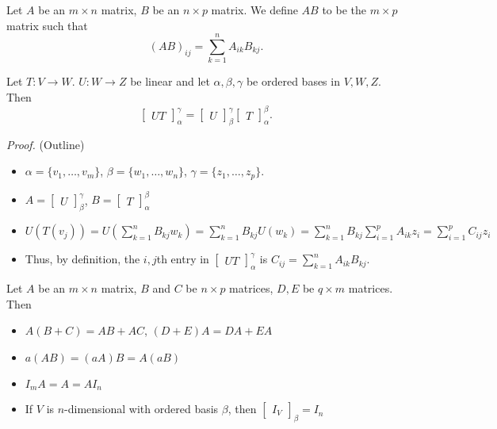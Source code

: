 \documentclass[12pt]{article}
\newenvironment{theorem}[2][Theorem]{\begin{trivlist}
\item[\hskip \labelsep {\bfseries #1}\hskip \labelsep {\bfseries #2.}]}{\end{trivlist}}
\newenvironment{definition}[2][Definition]{\begin{trivlist}
\item[\hskip \labelsep {\bfseries #1}\hskip \labelsep {\bfseries #2}]}{\end{trivlist}}
\begin{document}
\begin{definition}{5}
Let $A$ be an $m \times n$ matrix, $B$ be an $n \times p$ matrix. We define $AB$ to be the $m \times p$ matrix such that $$(AB)_{ij} = \sum_{k = 1}^nA_{ik}B_{kj}.$$
\end{definition}

\begin{theorem}{2.11}
Let $T : V \to W$. $U : W \to Z$ be linear and let $\alpha, \beta, \gamma$ be ordered bases in $V, W, Z$. Then $$\begin{bmatrix} UT \end{bmatrix}_\alpha^\gamma = \begin{bmatrix} U \end{bmatrix}_\beta^\gamma\begin{bmatrix} T \end{bmatrix}_\alpha^\beta.$$
\end{theorem}

\textit{Proof.} (Outline)
\begin{itemize}
    \item $\alpha = \{v_1, \dots, v_m\}$, $\beta = \{w_1, \dots, w_n\}$, $\gamma = \{z_1, \dots, z_p\}$.
    \item $A = \begin{bmatrix} U \end{bmatrix}_\beta^\gamma$, $B = \begin{bmatrix} T \end{bmatrix}_\alpha^\beta$
    \item $U(T(v_j)) = U\left( \sum_{k = 1}^n B_{kj}w_k \right) = \sum_{k = 1}^n B_{kj}U(w_k) = \sum_{k = 1}^n B_{kj} \sum_{i = 1}^p A_{ik}z_i = \sum_{i = 1}^p C_{ij}z_i$
    \item Thus, by definition, the $i,j$th entry in $\begin{bmatrix} UT \end{bmatrix}_\alpha^\gamma$ is $C_{ij} = \sum_{k = 1}^nA_{ik}B_{kj}$.
\end{itemize}

\begin{theorem}{2.12}
Let $A$ be an $m \times n$ matrix, $B$ and $C$ be $n \times p$ matrices, $D, E$ be $q \times m$ matrices. Then 
\begin{itemize}
    \item $A(B + C) = AB + AC$, $(D + E)A = DA + EA$
    \item $a(AB) = (aA)B = A(aB)$
    \item $I_mA = A = AI_n$
    \item If $V$ is $n$-dimensional with ordered basis $\beta$, then $\begin{bmatrix} I_V \end{bmatrix}_\beta = I_n$
\end{itemize}
\end{theorem}
\end{document}
